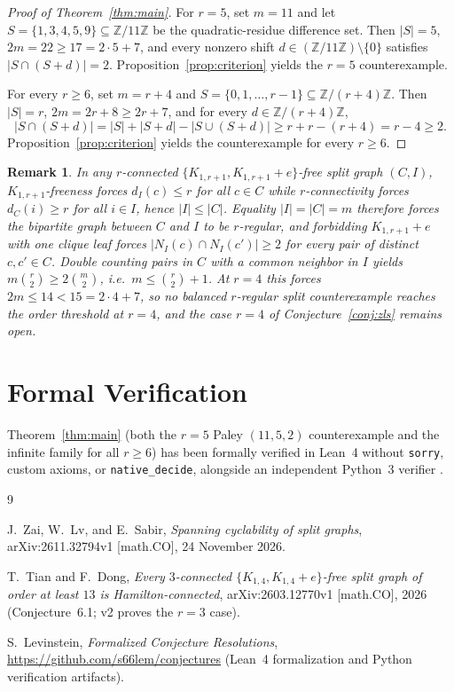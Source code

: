 \documentclass[11pt,a4paper]{article}
\newtheorem{remark}[theorem]{Remark}
\begin{document}
\begin{proof}[Proof of Theorem~\ref{thm:main}]
For $r = 5$, set $m = 11$ and let $S = \{1,3,4,5,9\} \subseteq \mathbb{Z}/11\mathbb{Z}$ be the quadratic-residue difference set. Then $|S| = 5$, $2m = 22 \ge 17 = 2\cdot 5 + 7$, and every nonzero shift $d \in (\mathbb{Z}/11\mathbb{Z}) \setminus \{0\}$ satisfies $|S \cap (S + d)| = 2$. Proposition~\ref{prop:criterion} yields the $r = 5$ counterexample.

For every $r \ge 6$, set $m = r + 4$ and $S = \{0,1,\dots,r-1\} \subseteq \mathbb{Z}/(r+4)\mathbb{Z}$. Then $|S| = r$, $2m = 2r + 8 \ge 2r + 7$, and for every $d \in \mathbb{Z}/(r+4)\mathbb{Z}$,
\[
|S \cap (S + d)| = |S| + |S + d| - |S \cup (S + d)| \ge r + r - (r + 4) = r - 4 \ge 2.
\]
Proposition~\ref{prop:criterion} yields the counterexample for every $r \ge 6$.
\end{proof}

\begin{remark}
In any $r$-connected $\{K_{1,r+1}, K_{1,r+1}+e\}$-free split graph $(C, I)$, $K_{1,r+1}$-freeness forces $d_I(c) \le r$ for all $c \in C$ while $r$-connectivity forces $d_C(i) \ge r$ for all $i \in I$, hence $|I| \le |C|$. Equality $|I| = |C| = m$ therefore forces the bipartite graph between $C$ and $I$ to be $r$-regular, and forbidding $K_{1,r+1}+e$ with one clique leaf forces $|N_I(c) \cap N_I(c')| \ge 2$ for every pair of distinct $c,c' \in C$. Double counting pairs in $C$ with a common neighbor in $I$ yields $m\binom{r}{2} \ge 2\binom{m}{2}$, i.e.\ $m \le \binom{r}{2} + 1$. At $r = 4$ this forces $2m \le 14 < 15 = 2\cdot 4 + 7$, so no balanced $r$-regular split counterexample reaches the order threshold at $r = 4$, and the case $r = 4$ of Conjecture~\ref{conj:zls} remains open.
\end{remark}

\section{Formal Verification}

Theorem~\ref{thm:main} (both the $r = 5$ Paley $(11,5,2)$ counterexample and the infinite family for all $r \ge 6$) has been formally verified in Lean~4 without \texttt{sorry}, custom axioms, or \texttt{native\_decide}, alongside an independent Python~3 verifier \cite{Repo}.

\begin{thebibliography}{9}
\raggedright
{}
J.~Zai, W.~Lv, and E.~Sabir,
\emph{Spanning cyclability of split graphs},
arXiv:2611.32794v1 [math.CO], 24 November 2026.

T.~Tian and F.~Dong,
\emph{Every $3$-connected $\{K_{1,4}, K_{1,4}+e\}$-free split graph of order at least $13$ is Hamilton-connected},
arXiv:2603.12770v1 [math.CO], 2026 (Conjecture~6.1; v2 proves the $r=3$ case).

S.~Levinstein,
\emph{Formalized Conjecture Resolutions},
\url{https://github.com/s66lem/conjectures} (Lean~4 formalization and Python verification artifacts).
\end{thebibliography}
\end{document}
